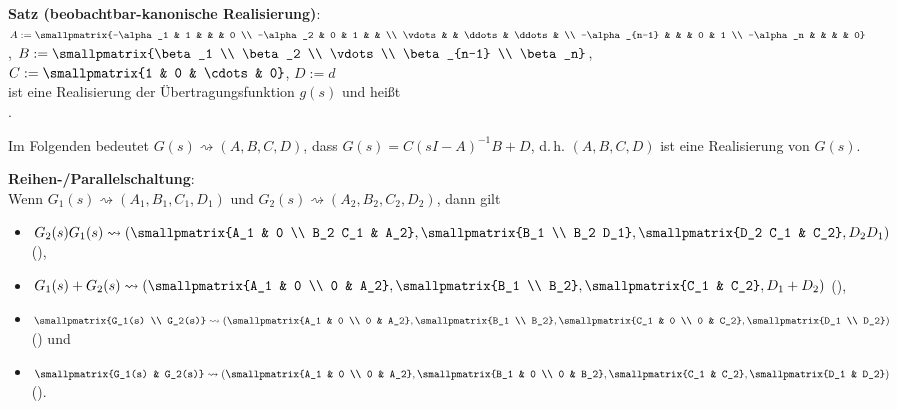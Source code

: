 \textbf{Satz (beobachtbar-kanonische Realisierung)}:\\
$A := \smallpmatrix{-\alpha_1 & 1 & & & 0 \\ -\alpha_2 & 0 & 1 & & \\
\vdots & & \ddots & \ddots & \\ -\alpha_{n-1} & & & 0 & 1 \\ -\alpha_n & & & & 0}$,
$B := \smallpmatrix{\beta_1 \\ \beta_2 \\ \vdots \\ \beta_{n-1} \\ \beta_n}$,
$C := \smallpmatrix{1 & 0 & \cdots & 0}$,
$D := d$\\
ist eine Realisierung der Übertragungsfunktion $g(s)$ und heißt\\
.

\linie

Im Folgenden bedeutet $G(s) \rightsquigarrow (A, B, C, D)$, dass
$G(s) = C(sI - A)^{-1} B + D$, d.\,h.
$(A, B, C, D)$ ist eine Realisierung von $G(s)$.

\textbf{Reihen-/Parallelschaltung}:\\
Wenn $G_1(s) \rightsquigarrow (A_1, B_1, C_1, D_1)$ und
$G_2(s) \rightsquigarrow (A_2, B_2, C_2, D_2)$,
dann gilt
\begin{itemize}
    \item
    $G_2(s) G_1(s) \rightsquigarrow
    \left(\smallpmatrix{A_1 & 0 \\ B_2 C_1 & A_2}, \smallpmatrix{B_1 \\ B_2 D_1},
    \smallpmatrix{D_2 C_1 & C_2}, D_2 D_1\right)$
    (),

    \item
    $G_1(s) + G_2(s) \rightsquigarrow
    \left(\smallpmatrix{A_1 & 0 \\ 0 & A_2}, \smallpmatrix{B_1 \\ B_2},
    \smallpmatrix{C_1 & C_2}, D_1 + D_2\right)$
    (),

    \item
    $\smallpmatrix{G_1(s) \\ G_2(s)} \rightsquigarrow
    \left(\smallpmatrix{A_1 & 0 \\ 0 & A_2}, \smallpmatrix{B_1 \\ B_2},
    \smallpmatrix{C_1 & 0 \\ 0 & C_2}, \smallpmatrix{D_1 \\ D_2}\right)$
    () und

    \item
    $\smallpmatrix{G_1(s) & G_2(s)} \rightsquigarrow
    \left(\smallpmatrix{A_1 & 0 \\ 0 & A_2}, \smallpmatrix{B_1 & 0 \\ 0 & B_2},
    \smallpmatrix{C_1 & C_2}, \smallpmatrix{D_1 & D_2}\right)$
    ().
\end{itemize}

